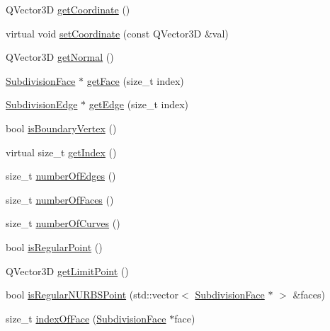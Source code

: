 \begin{DoxyCompactItemize}
\item 
Q\-Vector3\-D \hyperlink{classShipCADGeometry_1_1SubdivisionPoint_a0cf49d3e181eb00c08119721b33275bc}{get\-Coordinate} ()
\item 
virtual void \hyperlink{classShipCADGeometry_1_1SubdivisionPoint_a98ab99a0ccc4709a40e05b36147c0f55}{set\-Coordinate} (const Q\-Vector3\-D \&val)
\item 
Q\-Vector3\-D \hyperlink{classShipCADGeometry_1_1SubdivisionPoint_a8dd5facd4006480baea4a7f4487094f5}{get\-Normal} ()
\item 
\hyperlink{classShipCADGeometry_1_1SubdivisionFace}{Subdivision\-Face} $\ast$ \hyperlink{classShipCADGeometry_1_1SubdivisionPoint_a673d2a2c94f52e5523a012959417dcc3}{get\-Face} (size\-\_\-t index)
\item 
\hyperlink{classShipCADGeometry_1_1SubdivisionEdge}{Subdivision\-Edge} $\ast$ \hyperlink{classShipCADGeometry_1_1SubdivisionPoint_a518c4e3dc5de74950c87ff0f733716ba}{get\-Edge} (size\-\_\-t index)
\item 
bool \hyperlink{classShipCADGeometry_1_1SubdivisionPoint_afbcf1244015a92be04faed20163699f7}{is\-Boundary\-Vertex} ()
\item 
virtual size\-\_\-t \hyperlink{classShipCADGeometry_1_1SubdivisionPoint_a8406682549c10ec9e1a184132f6ed2f0}{get\-Index} ()
\item 
size\-\_\-t \hyperlink{classShipCADGeometry_1_1SubdivisionPoint_a7f798acd30dd4f5c9d0a9832ddd088de}{number\-Of\-Edges} ()
\item 
size\-\_\-t \hyperlink{classShipCADGeometry_1_1SubdivisionPoint_a24915c41e00cd2781aa40b09c7425486}{number\-Of\-Faces} ()
\item 
size\-\_\-t \hyperlink{classShipCADGeometry_1_1SubdivisionPoint_afc9659ec83083e7725ce14a12a74d2f0}{number\-Of\-Curves} ()
\item 
bool \hyperlink{classShipCADGeometry_1_1SubdivisionPoint_a6a0b4b628563cda2b2979ce6222e8a20}{is\-Regular\-Point} ()
\item 
Q\-Vector3\-D \hyperlink{classShipCADGeometry_1_1SubdivisionPoint_a0eb743069fe2ee2e99cdf7417b2400d5}{get\-Limit\-Point} ()
\item 
bool \hyperlink{classShipCADGeometry_1_1SubdivisionPoint_a88243019864c79766266cee627671183}{is\-Regular\-N\-U\-R\-B\-S\-Point} (std\-::vector$<$ \hyperlink{classShipCADGeometry_1_1SubdivisionFace}{Subdivision\-Face} $\ast$ $>$ \&faces)
\item 
size\-\_\-t \hyperlink{classShipCADGeometry_1_1SubdivisionPoint_a354475f80700fee46dcb46f8602c5345}{index\-Of\-Face} (\hyperlink{classShipCADGeometry_1_1SubdivisionFace}{Subdivision\-Face} $\ast$face)

\end{DoxyCompactItemize}
